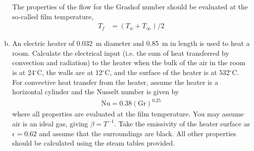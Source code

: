 \documentclass[calculator,datasheet,handbook,solutions]{exam}
\begin{document}
\begin{question}
\begin{enumerate}[a)]
{      The properties of the flow for the Grashof number should be
      evaluated at the so-called film temperature,
      \begin{align*}
        T_f &= \left(T_w+T_\infty\right) / 2
      \end{align*}
    }
  \item   An electric heater of 0.032~m diameter and 0.85~m in length is
    used to heat a room. Calculate the electrical input (i.e. the sum
    of heat transferred by convection and radiation) to the heater
    when the bulk of the air in the room is at 24${}^\circ$C, the
    walls are at 12${}^\circ$C, and the surface of the heater is at
    532${}^\circ$C. For convective heat transfer from the heater,
    assume the heater is a horizontal cylinder and the Nusselt number
    is given by
    \begin{align*}
      \text{Nu}=0.38(\text{Gr})^{0.25}
    \end{align*}
    where all properties are evaluated at the film temperature. You
    may assume air is an ideal gas, giving $\beta=T^{-1}$. Take the
    emissivity of the heater surface as ${\epsilon=0.62}$ and assume
    that the surroundings are black. All other properties should be
    calculated using the steam tables provided.%
\end{enumerate}
\end{question}
\end{document}
